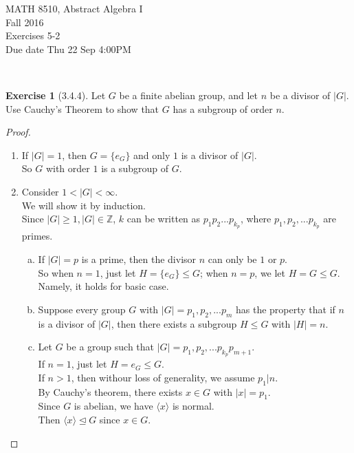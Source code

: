 \documentclass{amsart}
\newcommand{\bbz}{\mathbb{Z}}
\theoremstyle{plain}
\theoremstyle{definition}
\newtheorem{exer}[lem]{Exercise}
\begin{document}
\noindent MATH 8510, Abstract Algebra I \\
Fall 2016\\
Exercises 5-2\\
Due date Thu 22 Sep 4:00PM

\

%
%

\begin{exer}[3.4.4]
Let $G$ be a finite abelian group, and let $n$ be a divisor of $|G|$. 
Use Cauchy's Theorem to show that $G$ has a subgroup of order $n$.
\begin{proof}
	\begin{enumerate}[(1)]
		\item
		  If $|G|=1$, then $G = \{e_G\}$ and only $1$ is a divisor of $|G|$.\\
		  So $G$ with order $1$ is a subgroup of $G$.
		 \item
		 Consider $1 < |G| < \infty$.\\
		 We will show it by induction.\\
		 Since $|G|\geq 1, |G|\in \bbz$, $k$ can be written as $p_1p_2...p_{k_p}$, where $p_1,p_2,...p_{k_p}$ are primes.\\
		 \begin{enumerate}[(a)]
		   \item
             If $|G| = p$ is a prime, then the divisor $n$ can only be $1$ or $p$.\\
             So when $n = 1$, just let $H = \{e_G\} \leq G$; when $n = p$, we let $H = G\leq G$.\\
             Namely, it holds for basic case.
		 	 \item
		 	  Suppose every group $G$ with $|G|= p_1,p_2,...p_{m}$ has the property that if $n$ is a divisor of $|G|$, then there exists a subgroup $H \leq G$ with $|H|=n$.
		 	  \item
				Let $G$ be a group such that $|G|= p_1,p_2,...p_{k_p}p_{m + 1}$. \\
				If $n=1$, just let $H = {e_G} \leq G$.\\
				If $n > 1$, then withour loss of generality, we assume $p_1|n$.\\
				By Cauchy's theorem, there exists $x \in G$ with $|x| = p_1$. \\
				Since $G$ is abelian, we have $\langle x\rangle$ is normal.\\
				Then $\langle x\rangle \unlhd G$ since $x\in G$.\\

\end{enumerate}
\end{enumerate}
\end{proof}
\end{exer}
\end{document}
